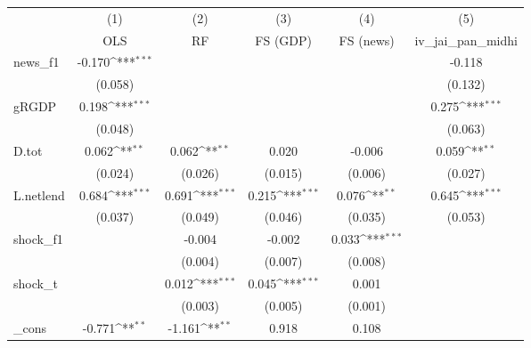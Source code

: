 {
\def\sym#1{\ifmmode^{#1}\else\(^{#1}\)\fi}
\begin{tabular}{l*{5}{c}}
\toprule
            &\multicolumn{1}{c}{(1)}&\multicolumn{1}{c}{(2)}&\multicolumn{1}{c}{(3)}&\multicolumn{1}{c}{(4)}&\multicolumn{1}{c}{(5)}\\
            &\multicolumn{1}{c}{OLS}&\multicolumn{1}{c}{RF}&\multicolumn{1}{c}{FS (GDP)}&\multicolumn{1}{c}{FS (news)}&\multicolumn{1}{c}{iv\_jai\_pan\_midhi}\\
\midrule
news\_f1     &      -0.170\sym{***}&                     &                     &                     &      -0.118         \\
            &     (0.058)         &                     &                     &                     &     (0.132)         \\
\addlinespace
gRGDP       &       0.198\sym{***}&                     &                     &                     &       0.275\sym{***}\\
            &     (0.048)         &                     &                     &                     &     (0.063)         \\
\addlinespace
D.tot       &       0.062\sym{**} &       0.062\sym{**} &       0.020         &      -0.006         &       0.059\sym{**} \\
            &     (0.024)         &     (0.026)         &     (0.015)         &     (0.006)         &     (0.027)         \\
\addlinespace
L.netlend   &       0.684\sym{***}&       0.691\sym{***}&       0.215\sym{***}&       0.076\sym{**} &       0.645\sym{***}\\
            &     (0.037)         &     (0.049)         &     (0.046)         &     (0.035)         &     (0.053)         \\
\addlinespace
shock\_f1    &                     &      -0.004         &      -0.002         &       0.033\sym{***}&                     \\
            &                     &     (0.004)         &     (0.007)         &     (0.008)         &                     \\
\addlinespace
shock\_t     &                     &       0.012\sym{***}&       0.045\sym{***}&       0.001         &                     \\
            &                     &     (0.003)         &     (0.005)         &     (0.001)         &                     \\
\addlinespace
\_cons      &      -0.771\sym{**} &      -1.161\sym{**} &       0.918         &       0.108         &                     \\

\end{tabular}}
